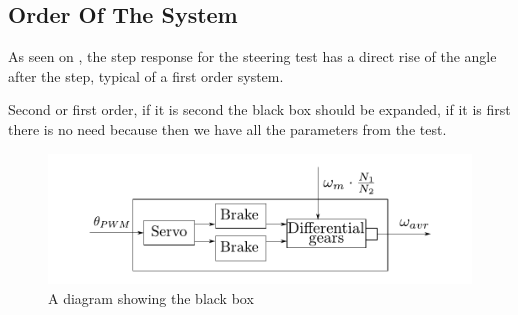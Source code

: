 \subsection{Order Of The System}
As seen on , the step response for the steering test has a direct rise of the angle after the step, typical of a first order system.

Second or first order, if it is second the black box should be expanded, if it is first there is no need because then we have all the parameters from the test.
 
\begin{figure}[H]
	\centering
	\includegraphics[scale=1]{figures/steeringDiagramBlackBox.pdf}
	\caption{A diagram showing the black box}
	\label{steeringDiagramBlackBox}
\end{figure}
 
 
